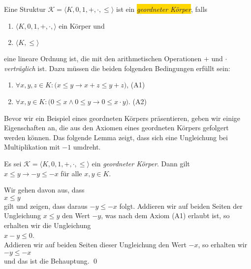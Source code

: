 \begin{Definition}  \hspace*{\fill} \linebreak
  Eine Struktur $\mathcal{K} = \langle K, 0, 1, +, \cdot, \leq \rangle$ ist ein 
  \colorbox{gold}{\emph{geordneter K\"orper}}, falls 
  \begin{enumerate}
  \item $\langle K, 0, 1, +, \cdot, \rangle$ ein K\"orper und
  \item $\langle K, \leq \rangle$
  \end{enumerate}
  eine lineare Ordnung ist, die mit den arithmetischen Operationen $+$ und $\cdot$ 
  \emph{vertr\"aglich} ist.  Dazu m\"ussen die beiden folgenden Bedingungen erf\"ullt sein:
  \begin{enumerate}
  \item $\forall x,y,z \in K: \bigl(x \leq y \rightarrow x + z \leq y + z\bigr)$,  \hspace*{\fill} (A1)
  \item $\forall x,y \in K:\bigl(0 \leq x \wedge 0 \leq y \rightarrow 0 \leq x \cdot y\bigr)$.  \hspace*{\fill} (A2)
  \end{enumerate}
\end{Definition}

Bevor wir ein Beispiel eines geordneten K\"orpers pr\"asentieren, geben wir einige Eigenschaften an, die
aus den Axiomen eines geordneten K\"orpers gefolgert werden k\"onnen.  Das folgende Lemma zeigt, dass
sich eine Ungleichung bei Multiplikation mit $-1$ umdreht.

\begin{Lemma} \label{lemma:l4}
  Es sei  $\mathcal{K} = \langle K, 0, 1, +, \cdot, \leq \rangle$ ein \emph{geordneter K\"orper}.
  Dann gilt
  \\[0.2cm]
  \hspace*{1.3cm} $x \leq y \rightarrow -y \leq -x$  \quad f\"ur alle $x,y \in K$.
\end{Lemma}

\proof
Wir gehen davon aus, dass
\\[0.2cm]
\hspace*{1.3cm}
$x \leq y$
\\[0.2cm]
gilt und zeigen, dass daraus $-y \leq -x$ folgt.  Addieren wir auf beiden Seiten der Ungleichung 
$x \leq y$ den Wert $-y$, was nach dem Axiom (A1) erlaubt ist, so erhalten wir die Ungleichung
\\[0.2cm]
\hspace*{1.3cm}
$x - y \leq 0$.
\\[0.2cm]
Addieren wir auf beiden Seiten dieser Ungleichung den Wert $-x$, so erhalten wir
\\[0.2cm]
\hspace*{1.3cm}
$-y \leq -x$
\\[0.2cm]
und das ist die Behauptung.  \qed

